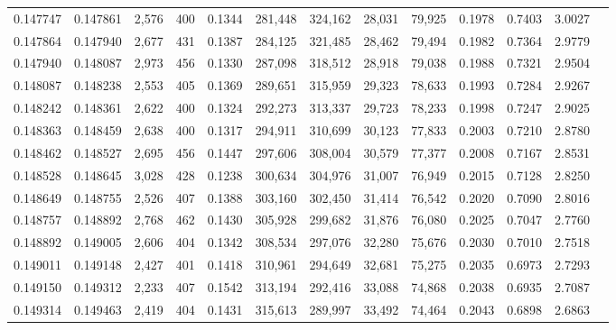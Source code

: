 \begin{tabular}{rrrrrrrrrrrrr}
0.147747 & 0.147861 & 2,576 & 400 &                                     0.1344 & 281,448 & 324,162 &  28,031 &  79,925 & 0.1978 & 0.7403 & 3.0027 \\
0.147864 & 0.147940 & 2,677 & 431 &                                     0.1387 & 284,125 & 321,485 &  28,462 &  79,494 & 0.1982 & 0.7364 & 2.9779 \\
0.147940 & 0.148087 & 2,973 & 456 &                                     0.1330 & 287,098 & 318,512 &  28,918 &  79,038 & 0.1988 & 0.7321 & 2.9504 \\
0.148087 & 0.148238 & 2,553 & 405 &                                     0.1369 & 289,651 & 315,959 &  29,323 &  78,633 & 0.1993 & 0.7284 & 2.9267 \\
0.148242 & 0.148361 & 2,622 & 400 &                                     0.1324 & 292,273 & 313,337 &  29,723 &  78,233 & 0.1998 & 0.7247 & 2.9025 \\
0.148363 & 0.148459 & 2,638 & 400 &                                     0.1317 & 294,911 & 310,699 &  30,123 &  77,833 & 0.2003 & 0.7210 & 2.8780 \\
0.148462 & 0.148527 & 2,695 & 456 &                                     0.1447 & 297,606 & 308,004 &  30,579 &  77,377 & 0.2008 & 0.7167 & 2.8531 \\
0.148528 & 0.148645 & 3,028 & 428 &                                     0.1238 & 300,634 & 304,976 &  31,007 &  76,949 & 0.2015 & 0.7128 & 2.8250 \\
0.148649 & 0.148755 & 2,526 & 407 &                                     0.1388 & 303,160 & 302,450 &  31,414 &  76,542 & 0.2020 & 0.7090 & 2.8016 \\
0.148757 & 0.148892 & 2,768 & 462 &                                     0.1430 & 305,928 & 299,682 &  31,876 &  76,080 & 0.2025 & 0.7047 & 2.7760 \\
0.148892 & 0.149005 & 2,606 & 404 &                                     0.1342 & 308,534 & 297,076 &  32,280 &  75,676 & 0.2030 & 0.7010 & 2.7518 \\
0.149011 & 0.149148 & 2,427 & 401 &                                     0.1418 & 310,961 & 294,649 &  32,681 &  75,275 & 0.2035 & 0.6973 & 2.7293 \\
0.149150 & 0.149312 & 2,233 & 407 &                                     0.1542 & 313,194 & 292,416 &  33,088 &  74,868 & 0.2038 & 0.6935 & 2.7087 \\
0.149314 & 0.149463 & 2,419 & 404 &                                     0.1431 & 315,613 & 289,997 &  33,492 &  74,464 & 0.2043 & 0.6898 & 2.6863 \\

\end{tabular}
